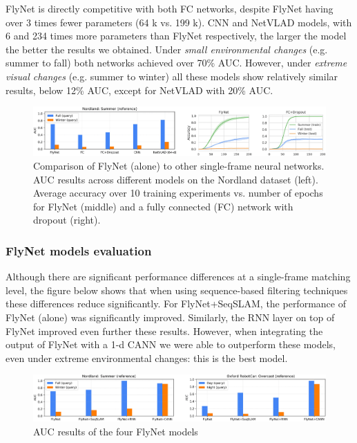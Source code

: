 FlyNet is directly competitive with both FC networks, despite FlyNet
having over 3 times fewer parameters (64 k vs. 199 k). CNN and NetVLAD
models, with 6 and 234 times more parameters than FlyNet respectively,
the larger the model the better the results we obtained. Under
\emph{small environmental changes} (e.g. summer to fall) both networks
achieved over 70\% AUC. However, under \emph{extreme visual changes}
(e.g. summer to winter) all these models show relatively similar
results, below 12\% AUC, except for NetVLAD with 20\% AUC.

\begin{figure}[h!]
\centering
\includegraphics[width=\linewidth]{images/flynetothermodels.png}
\caption{Comparison of FlyNet (alone) to other single-frame neural networks. AUC results across different models on the Nordland dataset (left). Average accuracy over 10 training experiments vs. number of epochs for FlyNet (middle) and a fully connected (FC) network with dropout (right).}
\end{figure}

\subsubsection{FlyNet models evaluation}\label{header-n218}

Although there are significant performance differences at a single-frame
matching level, the figure below shows that when using sequence-based
filtering techniques these differences reduce significantly. For
FlyNet+SeqSLAM, the performance of FlyNet (alone) was significantly
improved. Similarly, the RNN layer on top of FlyNet improved even
further these results. However, when integrating the output of FlyNet
with a 1-d CANN we were able to outperform these models, even under
extreme environmental changes: this is the best model.

\begin{figure}[h!]
\centering
\includegraphics[width=1\linewidth]{images/flynetcomparemodels.png}
\caption{AUC results of the four FlyNet models}
\end{figure}

